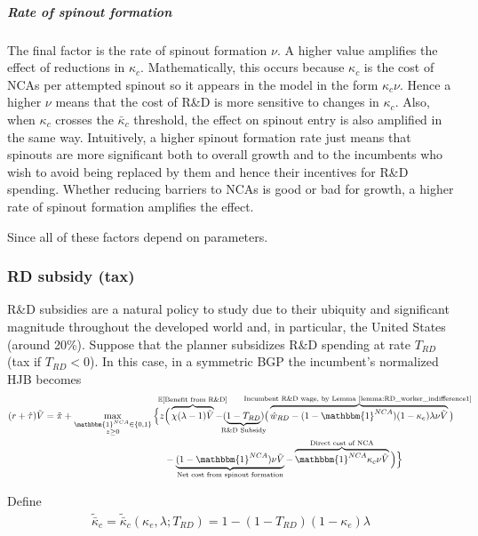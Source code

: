 \documentclass[11pt,english]{article}
\begin{document}
\subparagraph{Rate of spinout formation}

The final factor is the rate of spinout formation $\nu$. A higher value amplifies the effect of reductions in $\kappa_c$. Mathematically, this occurs because $\kappa_c$ is the cost of NCAs per attempted spinout so it appears in the model in the form $\kappa_c \nu$. Hence a higher $\nu$ means that the cost of R\&D is more sensitive to changes in $\kappa_c$. Also, when $\kappa_c$ crosses the $\bar{\kappa}_c$ threshold, the effect on spinout entry is also amplified in the same way. Intuitively, a higher spinout formation rate just means that spinouts are more significant both to overall growth and to the incumbents who wish to avoid being replaced by them and hence their incentives for R\&D spending. Whether reducing barriers to NCAs is good or bad for growth, a higher rate of spinout formation amplifies the effect. 

Since all of these factors depend on parameters. 
 

\subsubsection{RD subsidy (tax)}

R\&D subsidies are a natural policy to study due to their ubiquity and significant magnitude throughout the developed world and, in particular, the United States (around 20\%). Suppose that the planner subsidizes R\&D spending at rate $T_{RD}$ (tax if $T_{RD} < 0$). In this case, in a symmetric BGP the incumbent's normalized HJB becomes
\begin{align}
(r + \hat{\tau}) \tilde{V} = \tilde{\pi} + \max_{\substack{\mathbbm{1}^{NCA} \in \{0,1\} \\ z \ge 0}} \Big\{z &\Big( \overbrace{\chi (\lambda - 1) \tilde{V}}^{\mathclap{\mathbb{E}[\textrm{Benefit from R\&D}]}}- (\underbrace{1-T_{RD}}_{\mathclap{\text{R\&D Subsidy}}}) \big( \overbrace{\hat{w}_{RD} - (1-\mathbbm{1}^{NCA})(1-\kappa_e)\lambda \nu \tilde{V}}^{\mathclap{\text{Incumbent R\&D wage, by Lemma \ref{lemma:RD_worker_indifference1} }}}\big) \label{eq:hjb_incumbent_RDsubsidy} \nonumber \\ 
&-  \underbrace{(1-\mathbbm{1}^{NCA}) \nu \tilde{V}}_{\mathclap{\text{Net cost from spinout formation}}} - \overbrace{\mathbbm{1}^{NCA} \kappa_{c} \nu \tilde{V}}^{\mathclap{\text{Direct cost of NCA}}}\Big) \Big\} 
\end{align}

Define
\begin{align}
\tilde{\bar{\kappa}}_c = \tilde{\bar{\kappa}}_c(\kappa_e,\lambda;T_{RD}) = 1 - (1-T_{RD})(1-\kappa_e)\lambda
\end{align} 
\end{document}

